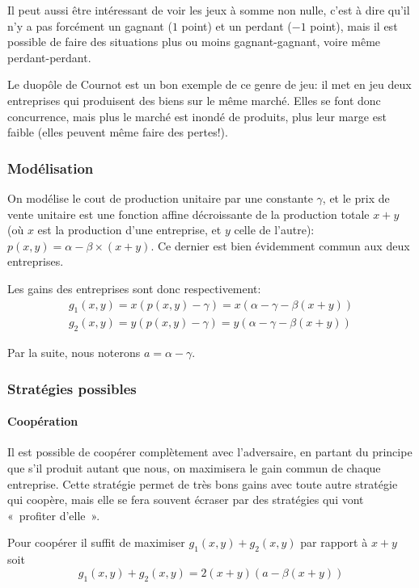   Il peut aussi être intéressant de voir les jeux à somme non nulle, c'est à
  dire qu'il n'y a pas forcément un gagnant ($1$ point) et un perdant ($-1$
  point), mais il est possible de faire des situations plus ou moins
  gagnant-gagnant, voire même perdant-perdant.

  Le duopôle de Cournot est un bon exemple de ce genre de jeu: il met en jeu
  deux entreprises qui produisent des biens sur le même marché. Elles se font
  donc concurrence, mais plus le marché est inondé de produits, plus leur marge
  est faible (elles peuvent même faire des pertes!).

  \subsubsection{Modélisation}
    On modélise le cout de production unitaire par une constante $\gamma$,
    et le prix de vente unitaire est une fonction affine décroissante de la
    production totale $x+y$ (où $x$ est la production d'une entreprise, et $y$
    celle de l'autre): $p(x, y) = \alpha - \beta\times (x + y)$. Ce dernier est bien
    évidemment commun aux deux entreprises.

    Les gains des entreprises sont donc respectivement:
      \[\begin{array}{c}
        g_1(x, y) = x (p(x, y)-\gamma) = x(\alpha-\gamma-\beta(x+y)) \\
        g_2(x, y) = y (p(x, y)-\gamma) = y(\alpha-\gamma-\beta(x+y))
      \end{array}\]

    Par la suite, nous noterons $a=\alpha-\gamma$.

  \subsubsection{Stratégies possibles}
    \paragraph{Coopération} Il est possible de coopérer complètement avec
      l'adversaire, en partant du principe que s'il produit autant que nous,
      on maximisera le gain commun de chaque entreprise.
      Cette stratégie permet de très bons gains avec toute autre stratégie qui
      coopère, mais elle se fera souvent écraser par des stratégies qui vont
      «~profiter d'elle~».

      Pour coopérer il suffit de maximiser $g_1(x, y)+g_2(x, y)$ par rapport à
      $x+y$ soit
        \[g_1(x, y) + g_2(x, y) = 2(x+y)(a - \beta(x+y))\]

